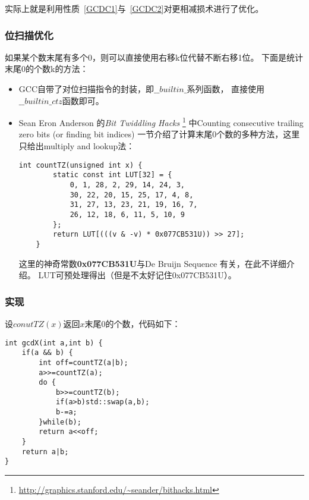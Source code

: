 实际上就是利用性质~\ref{GCDC1}与~\ref{GCDC2}对更相减损术进行了优化。

\subsubsection{位扫描优化}

如果某个数末尾有多个0，则可以直接使用右移k位代替不断右移1位。
下面是统计末尾0的个数k的方法：

\begin{itemize}
    \item GCC自带了对位扫描指令的封装，即$\_\_builtin\_$系列函数，
    直接使用$\_\_builtin\_ctz$函数即可。
    \item Sean Eron Anderson 的\emph{Bit Twiddling Hacks}
    \footnote{\url{http://graphics.stanford.edu/~seander/bithacks.html}}
    中Counting consecutive trailing zero bits (or finding bit indices)
    一节介绍了计算末尾0个数的多种方法，这里只给出multiply and lookup法：
    \begin{lstlisting}[title=countTZ]
    int countTZ(unsigned int x) {
        static const int LUT[32] = {
            0, 1, 28, 2, 29, 14, 24, 3,
            30, 22, 20, 15, 25, 17, 4, 8,
            31, 27, 13, 23, 21, 19, 16, 7,
            26, 12, 18, 6, 11, 5, 10, 9
        };
        return LUT[(((v & -v) * 0x077CB531U)) >> 27];
    }
    \end{lstlisting}
    这里的神奇常数{\bfseries 0x077CB531U}与De Bruijn Sequence
    有关，在此不详细介绍。
    LUT可预处理得出（但是不太好记住0x077CB531U）。
\end{itemize}

\subsubsection{实现}

设$conutTZ(x)$返回$x$末尾0的个数，代码如下：

\begin{lstlisting}[title=gcdX]
int gcdX(int a,int b) {
    if(a && b) {
        int off=countTZ(a|b);
        a>>=countTZ(a);
        do {
            b>>=countTZ(b);
            if(a>b)std::swap(a,b);
            b-=a;
        }while(b);
        return a<<off;
    }
    return a|b;
}
\end{lstlisting}
